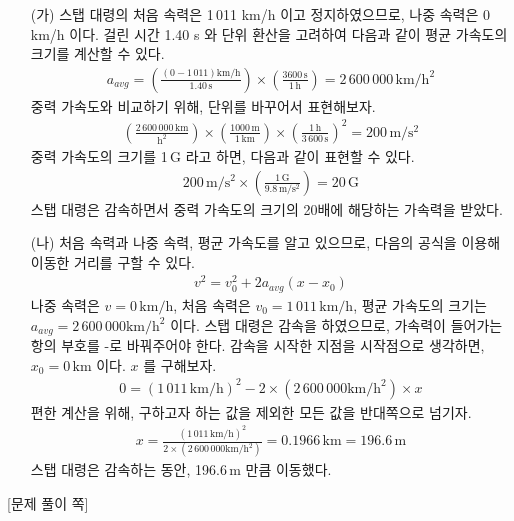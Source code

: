 \documentclass[APS,floatfix,nofootinbib,superscriptaddress,fleqn,preprint]{revtex4}
\begin{document}
\begin{itemize}
  \item [(가)] 스탭 대령의 처음 속력은 1\,011 km/h 이고 정지하였으므로, 나중 속력은 0 km/h 이다. 걸린 시간 1.40 s 와 단위 환산을 고려하여 다음과 같이 평균 가속도의 크기를 계산할 수 있다.
  \begin{align}
    a_{avg} = \left(\frac{(0-1\,011)\mathrm{km/h}}{1.40 \,\mathrm{s}}\right)\times\left(\frac{3600\,\mathrm{s}}{1\,\mathrm{h}}\right)=2\,600\,000\,\mathrm{km/h^2}
  \end{align} 
  중력 가속도와 비교하기 위해, 단위를 바꾸어서 표현해보자.
  \begin{align}
    \left(\mathrm{\frac{2\,600\,000\,km}{h^2}}\right)\times\left(\mathrm{\frac{1000\,m}{1\,km}}\right)\times\mathrm{\left(\frac{1\,h}{3\,600\,s}\right)^2}=200\,\mathrm{m/s^2}
  \end{align}
  중력 가속도의 크기를 1\,G 라고 하면, 다음과 같이 표현할 수 있다.
  \begin{align}
  \mathrm{200\,m/s^2}\times\left(\frac{1\,\mathrm{G}}{9.8\,\mathrm{m/s^2}}\right) = 20\,\mathrm{G}
  \end{align} 
  스탭 대령은 감속하면서 중력 가속도의 크기의 20배에 해당하는 가속력을 받았다.
  \item [(나)] 처음 속력과 나중 속력, 평균 가속도를 알고 있으므로, 다음의 공식을 이용해 이동한 거리를 구할 수 있다.
  \begin{align}
    v^2=v_0^2+2a_{avg}(x-x_0)
  \end{align}
  나중 속력은 $v=\mathrm{0\,km/h}$, 처음 속력은 $v_0=\mathrm{1\,011\,km/h}$, 평균 가속도의 크기는 $a_{avg}=2\,600\,000\mathrm{km/h^2}$ 이다. 스탭 대령은 감속을 하였으므로, 가속력이 들어가는 항의 부호를 -로 바꿔주어야 한다. 감속을 시작한 지점을 시작점으로 생각하면, $x_0=0\,\mathrm{km}$ 이다. $x$ 를 구해보자.
  \begin{align}
    0=\left(\mathrm{1\,011\,km/h}\right)^2-2\times\left(2\,600\,000\mathrm{km/h^2}\right)\times x
  \end{align}    
  편한 계산을 위해, 구하고자 하는 값을 제외한 모든 값을 반대쪽으로 넘기자.
  \begin{align}    
    x=\frac{\left(\mathrm{1\,011\,km/h}\right)^2}{2\times\left(2\,600\,000\mathrm{km/h^2}\right)}=0.1966\,\mathrm{km}=196.6\,\mathrm{m}
  \end{align}
  스탭 대령은 감속하는 동안, 196.6\,m 만큼 이동했다.
\end{itemize}

\newpage

{\color{gray} [문제 풀이 쪽]}
\end{document}
